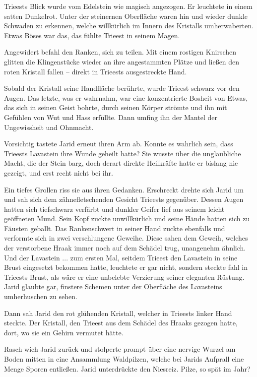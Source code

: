 Trieests Blick wurde vom Edelstein wie magisch angezogen. Er leuchtete in einem satten Dunkelrot. Unter der steinernen Oberfläche waren hin und wieder dunkle Schwaden zu erkennen, welche willkürlich im Innern des Kristalls umherwaberten. Etwas Böses war das, das fühlte Trieest in seinem Magen.

Angewidert befahl den Ranken, sich zu teilen. Mit einem rostigen Knirschen glitten die Klingenstücke wieder an ihre angestammten Plätze und ließen den roten Kristall fallen – direkt in Trieests ausgestreckte Hand.

Sobald der Kristall seine Handfläche berührte, wurde Trieest schwarz vor den Augen. Das letzte, was er wahrnahm, war eine konzentrierte Bosheit von Etwas, das sich in seinen Geist bohrte, durch seinen Körper strömte und ihn mit Gefühlen von Wut und Hass erfüllte. Dann umfing ihn der Mantel der Ungewissheit und Ohnmacht.



\trennzeichen



Vorsichtig tastete Jarid erneut ihren Arm ab. Konnte es wahrlich sein, dass Trieests Lavastein ihre Wunde geheilt hatte? Sie wusste über die unglaubliche Macht, die der Stein barg, doch derart direkte Heilkräfte hatte er bislang nie gezeigt, und erst recht nicht bei ihr.

Ein tiefes Grollen riss sie aus ihren Gedanken. Erschreckt drehte sich Jarid um und sah sich dem zähnefletschenden Gesicht Trieests gegenüber. Dessen Augen hatten sich tiefschwarz verfärbt und dunkler Geifer lief aus seinem leicht geöffneten Mund. Sein Kopf zuckte unwillkürlich und seine Hände hatten sich zu Fäusten geballt. Das Rankenschwert in seiner Hand zuckte ebenfalls und verformte sich in zwei verschlungene Geweihe. Diese sahen dem Geweih, welches der verstorbene Hraak immer noch auf dem Schädel trug, unangenehm ähnlich. Und der Lavastein ... zum ersten Mal, seitdem Trieest den Lavastein in seine Brust eingesetzt bekommen hatte, leuchtete er gar nicht, sondern steckte fahl in Trieests Brust, als wäre er eine unbelebte Verzierung seiner eleganten Rüstung. Jarid glaubte gar, finstere Schemen unter der Oberfläche des Lavasteins umherhuschen zu sehen.

Dann sah Jarid den rot glühenden Kristall, welcher in Trieests linker Hand steckte. Der Kristall, den Trieest aus dem Schädel des Hraaks gezogen hatte, dort, wo sie ein Gehirn vermutet hätte.

Rasch wich Jarid zurück und stolperte prompt über eine nervige Wurzel am Boden mitten in eine Ansammlung Waldpilzen, welche bei Jarids Aufprall eine Menge Sporen entließen. Jarid unterdrückte den Niesreiz. Pilze, so spät im Jahr?

